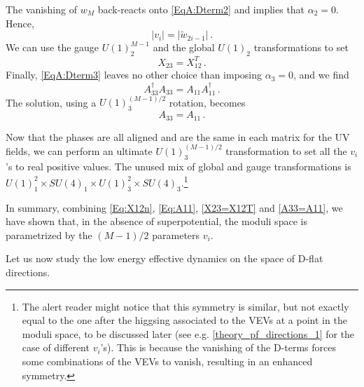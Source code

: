 \documentclass[a4paper,12pt]{article}
\begin{document}
{The vanishing of $w_M$ back-reacts onto \eqref{EqA:Dterm2} and implies that $\alpha_2 =0$. Hence,
	\begin{equation}
		\vert v_i \vert = \vert \tilde{w}_{2i-1}\vert \, .
	\end{equation}
We can use the gauge $U(1)^{M-1}_2$ and the global $U(1)_2$ transformations to set 
\begin{equation}
X_{23} = X_{12}^T \, .
\label{X23=X12T}
\end{equation}	
Finally, \eqref{EqA:Dterm3} leaves no other choice than imposing $\alpha_3 = 0$, and we find
\begin{equation}
		A_{33}^\dagger A_{33} = A_{11}A_{11}^\dagger \, .
\end{equation}
The solution, using a $U(1)^{(M-1)/2}_3$ rotation, becomes
\begin{equation}
	A_{33} = A_{11} \, .
	\label{A33=A11}
\end{equation}

Now that the phases are all aligned and are the same in each matrix for the UV fields, we can perform an ultimate $U(1)^{(M-1)/2}_3$ transformation to set all the $v_i$'s to real positive values. The unused mix of global and gauge transformations is $U(1)^2_1\times SU(4)_1 \times U(1)^2_3\times SU(4)_3 $.\footnote{The alert reader might notice that this symmetry is similar, but not exactly equal to the one after the higgsing associated to the VEVs at a point in the moduli space, to be discussed later (see e.g. \eqref{theory_pf_directions_1} for the case of different $v_i$'s). This is because the vanishing of the D-terms forces some combinations of the VEVs to vanish, resulting in an enhanced symmetry.}  

In summary, combining \eqref{Eq:X12n}, \eqref{Eq:A11}, \eqref{X23=X12T} and \eqref{A33=A11}, we have shown that, in the absence of superpotential, the moduli space is parametrized by the $(M-1)/2$ parameters $v_i$. 

Let us now study the low energy effective dynamics on the space of D-flat directions. 

}
\end{document}
